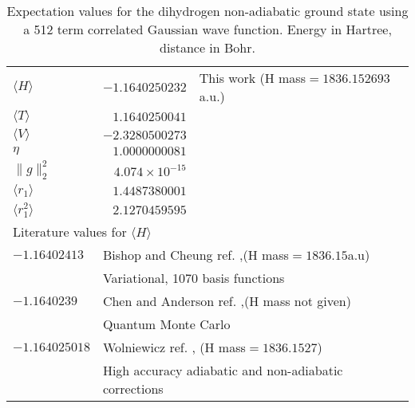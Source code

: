 \begin{table}[!pth]
\caption{Expectation values for the dihydrogen non-adiabatic ground state
         using a 512 term correlated {G}aussian wave function.
         Energy in Hartree, distance in Bohr. 
\label{results}}

\begin{tabular}{lrl}
$\langle H \rangle$ & $-1.1640250232$ & This work (H mass$=1836.152693$a.u.)\\

$\langle T \rangle$ & $ 1.1640250041$  & \\
$\langle V \rangle$ & $-2.3280500273$  & \\
$\eta$              & $ 1.0000000081$  & \\
$\|g\|_{2}^{2}$     & $ 4.074 \times 10^{-15}$  & \\
$\langle r_1 \rangle$ & $ 1.4487380001$                & \\
$\langle r_{1}^{2} \rangle$ & $  2.1270459595$         & \\
\hline
\multicolumn{3}{l}{Literature values for $\langle H \rangle$}\\
\hline
 $-1.16402413$ &\multicolumn{2}{l}{
        Bishop and Cheung ref. \cite{Bishop77b},(H mass$=1836.15$a.u)}\\ 
        &\multicolumn{2}{l}{Variational, 1070 basis functions} \\
 $-1.1640239$ &\multicolumn{2}{l}{
        Chen and Anderson ref. \cite{Chen95},(H mass not given)}\\
        &\multicolumn{2}{l}{Quantum Monte Carlo} \\
 $-1.164025018$ &\multicolumn{2}{l}{
        Wolniewicz ref. \cite{Wolniewicz95}, (H mass$=1836.1527$)}\\
        &\multicolumn{2}{l}{
        High accuracy adiabatic and non-adiabatic corrections}\\
\end{tabular}
\end{table}


%

